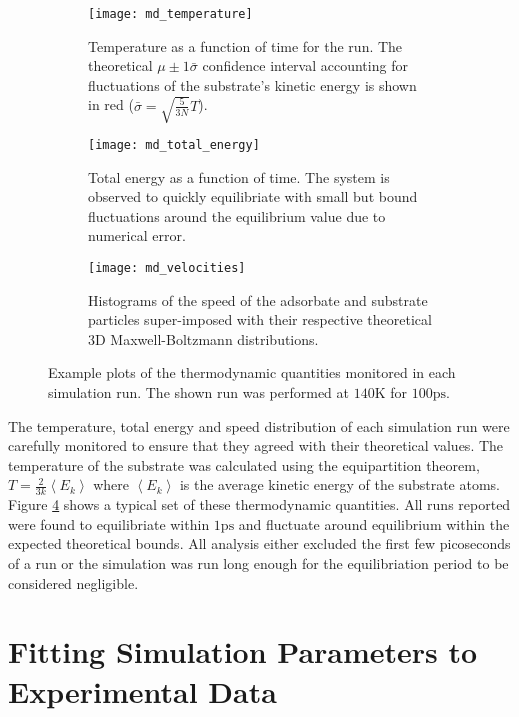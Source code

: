 \begin{figure}
	\centering
	\begin{subfigure}[t]{0.48\textwidth}
		\texttt{[image: md\_temperature]}
		\caption{Temperature as a function of time for the run. The theoretical $\mu \pm 1\bar{\sigma}$ confidence interval accounting for fluctuations of the substrate's kinetic energy is shown in red ($\bar{\sigma}=\sqrt{\frac{5}{3N}}T$).}
		\label{fig:md_temperature}
	\end{subfigure}
	\hfill
	\begin{subfigure}[t]{0.48\textwidth}
		\texttt{[image: md\_total\_energy]}
		\caption{Total energy as a function of time. The system is observed to quickly equilibriate with small but bound fluctuations around the equilibrium value due to numerical error.}
		\label{fig:md_total_energy}
	\end{subfigure}
	\begin{subfigure}[t]{0.9\textwidth}
		\texttt{[image: md\_velocities]}
		\caption{Histograms of the speed of the adsorbate and substrate particles super-imposed with their respective theoretical 3D Maxwell-Boltzmann distributions.}
		\label{fig:md_velocities}
	\end{subfigure}
	\caption{Example plots of the thermodynamic quantities monitored in each simulation run. The shown run was performed at $140\si{\kelvin}$ for $100\si{\pico\second}$.}
	\label{fig:thermodynamics}
\end{figure}

The temperature, total energy and speed distribution of each simulation run were carefully monitored to ensure that they agreed with their theoretical values. The temperature of the substrate was calculated using the equipartition theorem, $T=\frac{2}{3k}\left<E_k\right>$ where $\left<E_k\right>$ is the average kinetic energy of the substrate atoms. Figure \ref{fig:thermodynamics} shows a typical set of these thermodynamic quantities. All runs reported were found to equilibriate within $1\si{\pico\second}$ and fluctuate around equilibrium within the expected theoretical bounds. All analysis either excluded the first few picoseconds of a run or the simulation was run long enough for the equilibriation period to be considered negligible.

\section{Fitting Simulation Parameters to Experimental Data} \label{sec:md_fit}

